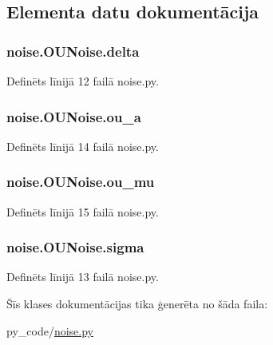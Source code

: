 \subsection{Elementa datu dokumentācija}
\subsubsection[{\texorpdfstring{delta}{delta}}]{\setlength{\rightskip}{0pt plus 5cm}noise.\+O\+U\+Noise.\+delta}\hypertarget{classnoise_1_1_o_u_noise_a0d32976eef71e3899eeff4d04ec50544}{}\label{classnoise_1_1_o_u_noise_a0d32976eef71e3899eeff4d04ec50544}


Definēts līnijā 12 failā noise.\+py.

\subsubsection[{\texorpdfstring{ou\+\_\+a}{ou_a}}]{\setlength{\rightskip}{0pt plus 5cm}noise.\+O\+U\+Noise.\+ou\+\_\+a}\hypertarget{classnoise_1_1_o_u_noise_aff4bb3aa350f605b987d90e72499afd9}{}\label{classnoise_1_1_o_u_noise_aff4bb3aa350f605b987d90e72499afd9}


Definēts līnijā 14 failā noise.\+py.

\subsubsection[{\texorpdfstring{ou\+\_\+mu}{ou_mu}}]{\setlength{\rightskip}{0pt plus 5cm}noise.\+O\+U\+Noise.\+ou\+\_\+mu}\hypertarget{classnoise_1_1_o_u_noise_ae5746606ef8e0c123814e782535c5b09}{}\label{classnoise_1_1_o_u_noise_ae5746606ef8e0c123814e782535c5b09}


Definēts līnijā 15 failā noise.\+py.

\subsubsection[{\texorpdfstring{sigma}{sigma}}]{\setlength{\rightskip}{0pt plus 5cm}noise.\+O\+U\+Noise.\+sigma}\hypertarget{classnoise_1_1_o_u_noise_ae47f26b40c75e9039ceef58859dccc90}{}\label{classnoise_1_1_o_u_noise_ae47f26b40c75e9039ceef58859dccc90}


Definēts līnijā 13 failā noise.\+py.



Šīs klases dokumentācijas tika ģenerēta no šāda faila\+:\begin{DoxyCompactItemize}
\item 
py\+\_\+code/\hyperlink{noise_8py}{noise.\+py}\end{DoxyCompactItemize}
